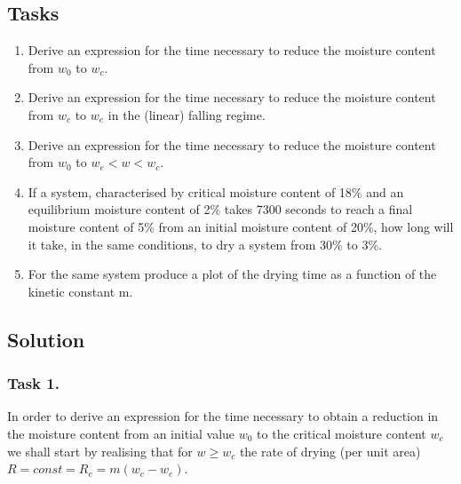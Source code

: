 \documentclass[letterpaper,10pt,english]{jupyterBook}
\begin{document}
\subsection{Tasks}
\label{\detokenize{Exercise_W10_2021:tasks}}\begin{enumerate}
%
\item {} 
\sphinxAtStartPar
Derive an expression for the time necessary to reduce the moisture content from \(w_0\) to \(w_c\).

\item {} 
\sphinxAtStartPar
Derive an expression for the time necessary to reduce the moisture content from \(w_c\) to \(w_e\) in the (linear) falling regime.

\item {} 
\sphinxAtStartPar
Derive an expression for the time necessary to reduce the moisture content from \(w_0\) to \(w_e<w<w_c\).

\item {} 
\sphinxAtStartPar
If a system, characterised by critical moisture content of 18\% and an equilibrium moisture content of 2\% takes 7300 seconds to reach a final moisture content of 5\% from an initial moisture content of 20\%, how long will it take, in the same conditions, to dry a system from 30\% to 3\%.

\item {} 
\sphinxAtStartPar
For the same system produce a plot of the drying time as a function of the kinetic constant m.

\end{enumerate}


\subsection{Solution}
\label{\detokenize{Exercise_W10_2021:solution}}

\subsubsection{Task 1.}
\label{\detokenize{Exercise_W10_2021:task-1}}
\sphinxAtStartPar
In order to derive an expression for the time necessary to obtain a reduction in the moisture content from an initial value \(w_0\) to the critical moisture content \(w_c\) we shall start by realising that for \(w\geq{w_c}\) the rate of drying (per unit area) \(R=const=R_c=m(w_c-w_e)\).
\end{document}
